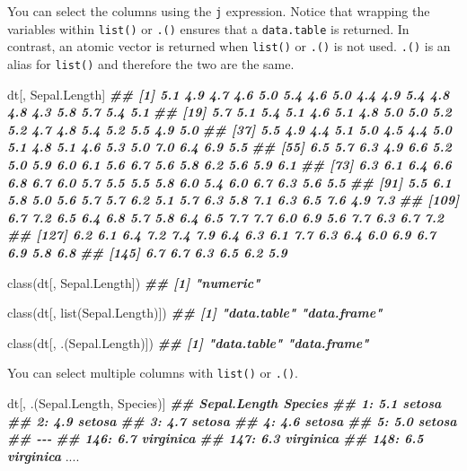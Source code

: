 \documentclass[
]{book}
\newenvironment{Shaded}{\begin{snugshade}}{\end{snugshade}}
\newcommand{\DocumentationTok}[1]{\textcolor[rgb]{0.56,0.35,0.01}{\textbf{\textit{#1}}}}
\newcommand{\FunctionTok}[1]{\textcolor[rgb]{0.00,0.00,0.00}{#1}}
\newcommand{\NormalTok}[1]{#1}
\begin{document}
You can select the columns using the \texttt{j} expression. Notice that wrapping the variables within \texttt{list()} or \texttt{.()} ensures that a \texttt{data.table} is returned. In contrast, an atomic vector is returned when \texttt{list()} or \texttt{.()} is not used. \texttt{.()} is an alias for \texttt{list()} and therefore the two are the same.

\begin{Shaded}
\begin{Highlighting}[]
\NormalTok{dt[, Sepal.Length]}
\DocumentationTok{\#\#   [1] 5.1 4.9 4.7 4.6 5.0 5.4 4.6 5.0 4.4 4.9 5.4 4.8 4.8 4.3 5.8 5.7 5.4 5.1}
\DocumentationTok{\#\#  [19] 5.7 5.1 5.4 5.1 4.6 5.1 4.8 5.0 5.0 5.2 5.2 4.7 4.8 5.4 5.2 5.5 4.9 5.0}
\DocumentationTok{\#\#  [37] 5.5 4.9 4.4 5.1 5.0 4.5 4.4 5.0 5.1 4.8 5.1 4.6 5.3 5.0 7.0 6.4 6.9 5.5}
\DocumentationTok{\#\#  [55] 6.5 5.7 6.3 4.9 6.6 5.2 5.0 5.9 6.0 6.1 5.6 6.7 5.6 5.8 6.2 5.6 5.9 6.1}
\DocumentationTok{\#\#  [73] 6.3 6.1 6.4 6.6 6.8 6.7 6.0 5.7 5.5 5.5 5.8 6.0 5.4 6.0 6.7 6.3 5.6 5.5}
\DocumentationTok{\#\#  [91] 5.5 6.1 5.8 5.0 5.6 5.7 5.7 6.2 5.1 5.7 6.3 5.8 7.1 6.3 6.5 7.6 4.9 7.3}
\DocumentationTok{\#\# [109] 6.7 7.2 6.5 6.4 6.8 5.7 5.8 6.4 6.5 7.7 7.7 6.0 6.9 5.6 7.7 6.3 6.7 7.2}
\DocumentationTok{\#\# [127] 6.2 6.1 6.4 7.2 7.4 7.9 6.4 6.3 6.1 7.7 6.3 6.4 6.0 6.9 6.7 6.9 5.8 6.8}
\DocumentationTok{\#\# [145] 6.7 6.7 6.3 6.5 6.2 5.9}

\FunctionTok{class}\NormalTok{(dt[, Sepal.Length])}
\DocumentationTok{\#\# [1] "numeric"}

\FunctionTok{class}\NormalTok{(dt[, }\FunctionTok{list}\NormalTok{(Sepal.Length)])}
\DocumentationTok{\#\# [1] "data.table" "data.frame"}

\FunctionTok{class}\NormalTok{(dt[, .(Sepal.Length)])}
\DocumentationTok{\#\# [1] "data.table" "data.frame"}
\end{Highlighting}
\end{Shaded}

You can select multiple columns with \texttt{list()} or \texttt{.()}.

\begin{Shaded}
\begin{Highlighting}[]

\NormalTok{dt[, .(Sepal.Length, Species)]}
\DocumentationTok{\#\#      Sepal.Length   Species}
\DocumentationTok{\#\#   1:          5.1    setosa}
\DocumentationTok{\#\#   2:          4.9    setosa}
\DocumentationTok{\#\#   3:          4.7    setosa}
\DocumentationTok{\#\#   4:          4.6    setosa}
\DocumentationTok{\#\#   5:          5.0    setosa}
\DocumentationTok{\#\#  {-}{-}{-}                       }
\DocumentationTok{\#\# 146:          6.7 virginica}
\DocumentationTok{\#\# 147:          6.3 virginica}
\DocumentationTok{\#\# 148:          6.5 virginica}
\NormalTok{....}
\end{Highlighting}
\end{Shaded}
\end{document}
